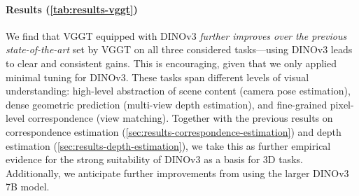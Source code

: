 \paragraph[Results]{Results (\cref{tab:results-vggt})}
We find that VGGT equipped with DINOv3 \emph{further improves over the previous state-of-the-art} set by VGGT on all three considered tasks---using DINOv3 leads to clear and consistent gains.
This is encouraging, given that we only applied minimal tuning for DINOv3.
These tasks span different levels of visual understanding: high-level abstraction of scene content (camera pose estimation), dense geometric prediction (multi-view depth estimation), and fine-grained pixel-level correspondence (view matching).
Together with the previous results on correspondence estimation (\cref{sec:results-correspondence-estimation}) and depth estimation (\cref{sec:results-depth-estimation}), we take this as further empirical evidence for the strong suitability of DINOv3 as a basis for 3D tasks.
Additionally, we anticipate further improvements from using the larger DINOv3 7B model. 

